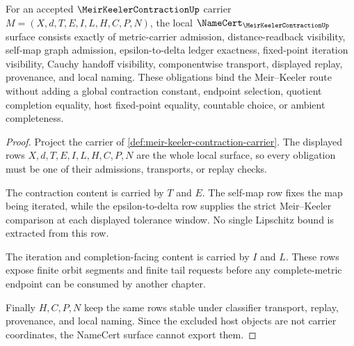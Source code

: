 \begin{theorem}
\label{thm:meir-keeler-contraction-namecert-obligations}
For an accepted $\MeirKeelerContractionUp$ carrier $M=(X,d,T,E,I,L,H,C,P,N)$, the local $\NameCert_{\MeirKeelerContractionUp}$ surface consists exactly of metric-carrier admission, distance-readback visibility, self-map graph admission, epsilon-to-delta ledger exactness, fixed-point iteration visibility, Cauchy handoff visibility, componentwise transport, displayed replay, provenance, and local naming. These obligations bind the Meir--Keeler route without adding a global contraction constant, endpoint selection, quotient completion equality, host fixed-point equality, countable choice, or ambient completeness.
\end{theorem}
\begin{proof}
Project the carrier of \autoref{def:meir-keeler-contraction-carrier}. The displayed rows $X,d,T,E,I,L,H,C,P,N$ are the whole local surface, so every obligation must be one of their admissions, transports, or replay checks.

The contraction content is carried by $T$ and $E$. The self-map row fixes the map being iterated, while the epsilon-to-delta row supplies the strict Meir--Keeler comparison at each displayed tolerance window. No single Lipschitz bound is extracted from this row.

The iteration and completion-facing content is carried by $I$ and $L$. These rows expose finite orbit segments and finite tail requests before any complete-metric endpoint can be consumed by another chapter.

Finally $H,C,P,N$ keep the same rows stable under classifier transport, replay, provenance, and local naming. Since the excluded host objects are not carrier coordinates, the NameCert surface cannot export them.
\end{proof}

